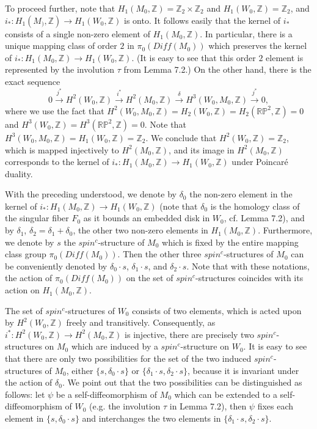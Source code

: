 \documentclass[11pt]{amsart}
\theoremstyle{plain}
\numberwithin{theorem}{section}
\theoremstyle{definition}
\newcommand{\R}{{\mathbb R}}
\newcommand{\Z}{{\mathbb Z}}
\renewcommand{\P}{{\mathbb P}}
\begin{document}
To proceed further, note that $H_1(M_0,\Z)=\Z_2\times \Z_2$ and $H_1(W_0,\Z)=\Z_2$, and $i_\ast: H_1(M_),\Z)\rightarrow H_1(W_0,\Z)$ is onto. It follows easily that the kernel of
$i_\ast$ consists of a single non-zero element of $H_1(M_0,\Z)$. In particular, there is a 
unique mapping class of order $2$ in $\pi_0(Diff(M_0))$ which preserves the kernel of 
$i_\ast: H_1(M_0,\Z)\rightarrow H_1(W_0,\Z)$. (It is easy to see that this order $2$ element is represented by the involution $\tau$ from Lemma 7.2.) On the other hand, there is the exact sequence
$$
0 \stackrel{j^\ast}{\longrightarrow} H^2(W_0,\Z)\stackrel{i^\ast}{\longrightarrow}
H^2(M_0,\Z)\stackrel{\delta}{\longrightarrow} H^3(W_0, M_0,\Z)\stackrel{j^\ast}{\longrightarrow} 0,
$$
where we use the fact that $H^2(W_0,M_0,\Z)=H_2(W_0,\Z)=H_2(\R\P^2,\Z)=0$ and $H^3(W_0,\Z)=H^3(\R\P^2,\Z)=0$. Note that $H^3(W_0,M_0,\Z)=H_1(W_0,\Z)=\Z_2$. We conclude 
that $H^2(W_0,\Z)=\Z_2$, which is mapped injectively to $H^2(M_0,\Z)$, and its image in 
$H^2(M_0,\Z)$ corresponds to the kernel of $i_\ast: H_1(M_0,\Z)\rightarrow H_1(W_0,\Z)$ under Poincar\'{e} duality.

With the preceding understood, we denote by $\delta_0$ the non-zero element in the kernel of
$i_\ast: H_1(M_0,\Z)\rightarrow H_1(W_0,\Z)$ (note that $\delta_0$ is the homology class of the
singular fiber $F_0$ as it bounds an embedded disk in $W_0$, cf. Lemma 7.2), and by $\delta_1$, 
$\delta_2=\delta_1+\delta_0$, the other two non-zero elements in $H_1(M_0,\Z)$. Furthermore, we denote by $s$ the $spin^c$-structure of $M_0$ which is fixed by the entire mapping class group 
$\pi_0(Diff(M_0))$. Then the other three
$spin^c$-structures of $M_0$ can be conveniently denoted by $\delta_0\cdot s$, $\delta_1\cdot s$, 
and $\delta_2\cdot s$. Note that with these notations, the action of $\pi_0(Diff(M_0))$ on the set of
$spin^c$-structures coincides with its action on $H_1(M_0,\Z)$. 

The set of $spin^c$-structures of $W_0$ consists of two elements, which is acted upon by 
$H^2(W_0,\Z)$ freely and transitively. Consequently, as $i^\ast: H^2(W_0,\Z)\rightarrow H^2(M_0,\Z)$ is injective, there are precisely two $spin^c$-structures on $M_0$ which are induced by a $spin^c$-structure on $W_0$. It is easy to see that there are only two possibilities for the set of the two induced $spin^c$-structures of $M_0$, either $\{s,\delta_0\cdot s\}$ or $\{\delta_1\cdot s,\delta_2\cdot s\}$, because it is invariant under the action of $\delta_0$. We point out that the two possibilities can be distinguished as follows: let $\psi$ be a self-diffeomorphism of $M_0$ which can be extended to a self-diffeomorphism of $W_0$ (e.g. the involution $\tau$ in Lemma 7.2), then $\psi$ fixes each element in $\{s,\delta_0\cdot s\}$ and interchanges the two elements in $\{\delta_1\cdot s,\delta_2\cdot s\}$. 
\end{document}
